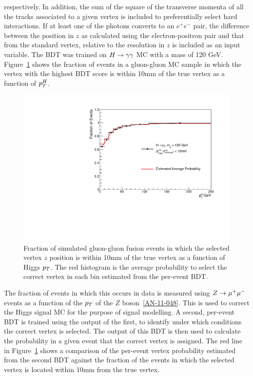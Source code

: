 respectively. In addition, the sum of the square of the transverse momenta of all the tracks associated 
to a given vertex is included to preferentially select hard interactions. If at least one of the 
photons converts to an $e^{+}e^{-}$ pair, the difference between the position in $z$ as calculated 
using the electron-positron pair and that from the standard vertex, relative to the resolution in $z$
is included as an input variable. The BDT was trained on $H\rightarrow\gamma\gamma$ MC with a mass of 120 GeV. 
Figure~\ref{fig:vtxeffhmc} shows the fraction of events in a gluon-gluon MC sample in which 
the vertex with the highest BDT score is within 10mm of the true vertex as a function of $p_{T}^{H}$.

\begin{figure}
\begin{center}
\includegraphics[width=.8\textwidth]{hgg7TeV/generalPlots/vtxEffHMC.pdf}
\caption{Fraction of simulated gluon-gluon fusion events in which the selected vertex $z$ position 
is within 10mm of the true vertex as a function of Higgs $p_{T}$. The red histogram is the average 
probability to select the correct vertex in each bin estimated from the per-event BDT.}
\end{center}
\label{fig:vtxeffhmc}
\end{figure} 

The fraction of events in which this occurs in data is measured using $Z\rightarrow \mu^{+}\mu^{-}$ events
as a function of the $p_{T}$ of the $Z$ boson~\ref{AN-11-048}. This is used to correct the Higgs signal MC for 
the purpose of signal modelling. A second, per-event BDT is trained using the output of the first, to identify 
under which conditions the correct vertex is selected. The output of this BDT is then used to 
calculate the probability in a given event that the correct vertex is assigned. The red line in Figure~\ref{fig:vtxeffhmc}
shows a comparison of the per-event vertex probability estimated from the second BDT against the 
fraction of the events in which the selected vertex is located within 10mm from the true vertex.

